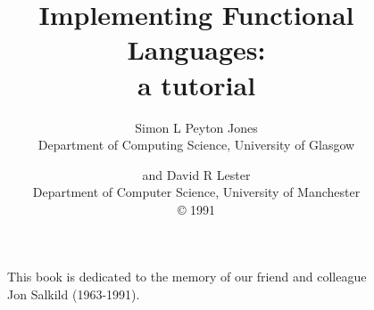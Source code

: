 \title{Implementing Functional Languages: \\ 
       a tutorial}
\author{Simon L Peyton Jones \\ 
        Department of Computing Science, University of Glasgow
\and
        and David R Lester \\
         Department of Computer Science, University of Manchester\\
         \copyright{} 1991}

\maketitle
\clearpage
\begin{figure}[t]
\parbox[t]{5in}{%
This book is dedicated to the memory of our friend and colleague
Jon Salkild (1963-1991).
}
\end{figure}
\clearpage
\setcounter{tocdepth}{1}
\tableofcontents
